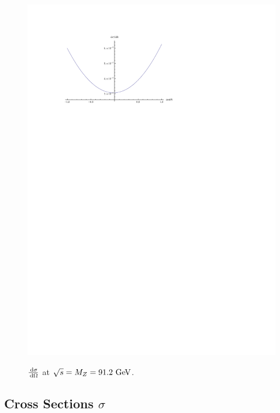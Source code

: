 \documentclass[]{article}
\begin{document}
\begin{figure}[H]
{		\includegraphics[scale=0.7]{sm_exact}
	}
	\caption{$\frac{\,\operatorname{d}\!{\sigma}}{\,\operatorname{d}\!{\Omega}}$ at $\sqrt{s}=M_{\Zzero}=91.2\GeV$.}
	\label{fig:diffexact}
\end{figure}



\subsection{Cross Sections $\sigma$}
\end{document}

